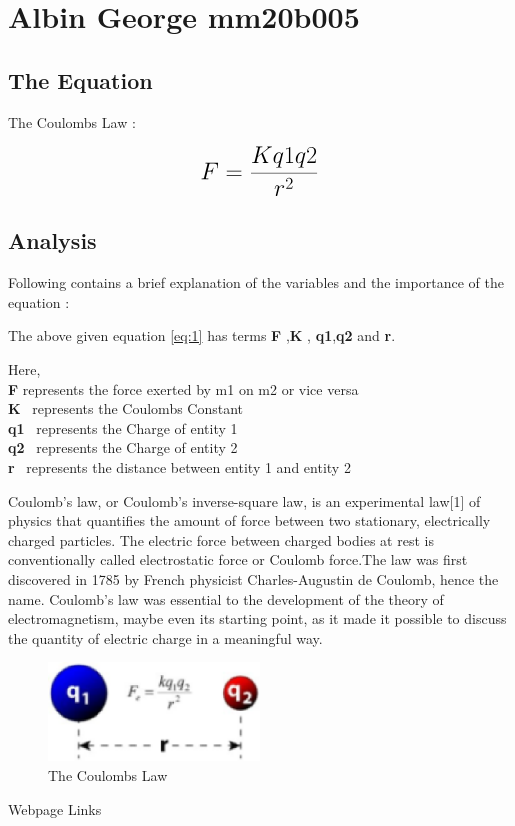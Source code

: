 \section{Albin George mm20b005}

\subsection{The Equation}

The Coulombs Law  :  

\begin{equation}
 {\LARGE{\textbf{$F =\frac{Kq1q2}{{r^2}}$}}}
 \label{eqn:equation}
\end{equation}


\subsection{Analysis}
Following contains a brief explanation of the variables and the importance of the equation :


{\normalsize {The above given equation \ref{eq:1}  has terms \textbf{F} ,\textbf{K} , \textbf{q1},\textbf{q2} and \textbf{r}.}}

{\normalsize { Here,}}\\
{\normalsize {\textbf{F} represents the force exerted by m1 on m2 or vice versa }}\\
{\normalsize {\textbf{K} \  represents the Coulombs Constant}}\\
{\normalsize {\textbf{q1} \  represents the Charge of entity 1}}\\
{\normalsize {\textbf{q2} \  represents the Charge of entity 2}}\\
{\normalsize{\textbf{r} \ represents the distance between entity 1 and entity 2}}



Coulomb's law, or Coulomb's inverse-square law, is an experimental law[1] of physics that quantifies the amount of force between two stationary, electrically charged particles. The electric force between charged bodies at rest is conventionally called electrostatic force or Coulomb force.The law was first discovered in 1785 by French physicist Charles-Augustin de Coulomb, hence the name. Coulomb's law was essential to the development of the theory of electromagnetism, maybe even its starting point, as it made it possible to discuss the quantity of electric charge in a meaningful way.

\begin{figure}[h]
	{\begin{center}
		\includegraphics[width=0.5\textwidth]{mm20b005/mm20b005.eps}
	\end{center}}
	\caption{The Coulombs Law\cite{picture}}
	\label{f1:image}
\end{figure}

Webpage Links \cite{website}

